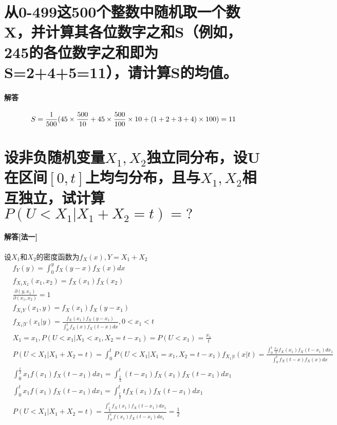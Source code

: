 \documentclass[UTF8]{ctexart}
\begin{document}
\section{从0-499这500个整数中随机取一个数X，并计算其各位数字之和S（例如，245的各位数字之和即为S=2+4+5=11），请计算S的均值。}
\paragraph{解答}
\begin{equation*}
S=\frac{1}{500}(45\times\frac{500}{10}+45\times\frac{500}{100}\times10+(1+2+3+4)\times100)=11\\
\end{equation*}
\section{设非负随机变量$X_1,X_2$独立同分布，设U在区间$[0,t]$上均匀分布，且与$X_1,X_2$相互独立，试计算$P(U<X_1\lvert X_1+X_2=t)=?$}
\paragraph{解答[法一]}
设$X_1$和$X_2$的密度函数为$f_X(x),Y=X_1+X_2$\\
\begin{equation*}
\begin{aligned}
&f_Y(y)=\int_0^yf_X(y-x)f_X(x)dx\\
&f_{X_1X_2}(x_1,x_2)=f_X(x_1)f_X(x_2)\\
&\frac{\partial(y,x_1)}{\partial(x_1,x_2)}=1\\
&f_{X_1Y}(x_1,y)=f_X(x_1)f_X(y-x_1)\\
&f_{X_1\lvert Y}(x_1\lvert y)=\frac{f_X(x_1)f_X(y-x_1)}{\int_0^tf_X(x)f_X(t-x)dx},0<x_1<t\\
&X_1=x_1,P(U<x_1\lvert X_1<x_1,X_2=t-x_1)=P(U<x_1)=\frac{x_1}{t}\\
&P(U<X_1\lvert X_1+X_2=t)=\int_0^tP(U<X_1\lvert X_1=x_1,X_2=t-x_1)f_{X_1\lvert t}(x\lvert t)=\frac{\int_0^t\frac{x_1}{t}f_X(x_1)f_X(t-x_1)dx_1}{\int_0^tf_X(t-x)f_X(x)dx}\\
&\int_0^{\frac{t}{2}}x_1f(x_1)f_X(t-x_1)dx_1=\int_{\frac{t}{2}}^t(t-x_1)f_X(x_1)f_X(t-x_1)dx_1\\
&\int_0^tx_1f(x_1)f_X(t-x_1)dx_1=\int_{\frac{t}{2}}^ttf_X(x_1)f_X(t-x_1)dx_1\\
&P(U<X_1\lvert X_1+X_2=t)=\frac{\int_{\frac{t}{2}}^tf_X(x_1)f_X(t-x_1)dx_1}{\int_0^tf(x_1)f_X(t-x_1)dx_1}=\frac{1}{2}\\
\end{aligned}
\end{equation*}
\end{document}
